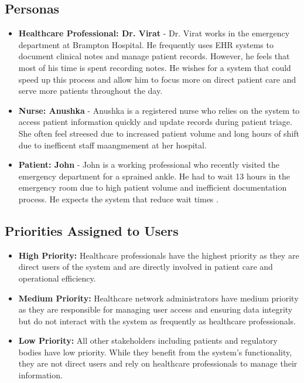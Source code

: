 \documentclass[12pt]{article}
\begin{document}
\subsection{Personas}
\begin{itemize}
    \item \textbf{Healthcare Professional: Dr. Virat} - Dr. Virat works in the emergency department at Brampton Hospital. He frequently uses EHR systems to document clinical notes and manage patient records. However, he feels that most of his time is spent recording notes. He wishes for a system that could speed up this process and allow him to focus more on direct patient care and serve more patients throughout the day.
    \item \textbf{Nurse: Anushka} - Anushka is a registered nurse who relies on the system to access patient information quickly and update records during patient triage. She often feel streesed due to increased patient volume and long hours of shift due to inefficent staff maangmement at her hospital.
    \item \textbf{Patient: John} - John is a working professional who recently visited the emergency department for a sprained ankle. He had to wait 13 hours in the emergency room due to high patient volume and inefficient documentation process. He expects the system that reduce wait times .
\end{itemize}

\subsection{Priorities Assigned to Users}
\begin{itemize}
    \item \textbf{High Priority:} Healthcare professionals have the highest priority as they are direct users of the system and are directly involved in patient care and operational efficiency.
    \item \textbf{Medium Priority:} Healthcare network administrators have medium priority as they are responsible for managing user access and ensuring data integrity but do not interact with the system as frequently as healthcare professionals.
    \item \textbf{Low Priority:} All other stakeholders including patients and regulatory bodies have low priority. While they benefit from the system's functionality, they are not direct users and rely on healthcare professionals to manage their information.
\end{itemize}
\end{document}
